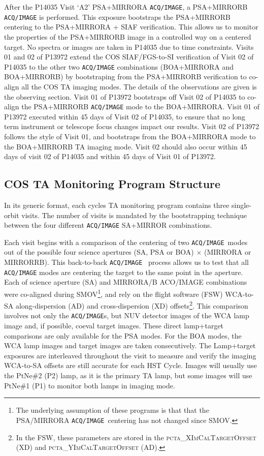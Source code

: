 \documentclass{stsci_report}
\newcommand{\tacq}[1]{\texttt{ACQ/#1}}
\begin{document}
After the P14035 Visit `A2' PSA+MIRRORA \tacq{IMAGE}, a PSA+MIRRORB \tacq{IMAGE} is performed.
This exposure bootstraps the PSA+MIRRORB centering to the PSA+MIRRORA + SIAF verification.
This allows us to monitor the properties of the PSA+MIRRORB image in a controlled way on a centered target. No spectra or images are taken in P14035 due to time constraints.
Visits 01 and 02 of P13972 extend the COS SIAF/FGS-to-SI verification of Visit 02 of P14035 to the other two \tacq{IMAGE} combinations (BOA+MIRRORA and BOA+MIRRORB) by bootstraping from the PSA+MIRRORB verification to co-align all the COS TA imaging modes. The details of the observations are given is the observing section.
Visit 01 of P13972 bootstraps off Visit 02 of P14035 to co-align the PSA+MIRRORB \tacq{IMAGE} mode to the BOA+MIRRORA. Visit 01 of P13972 executed within 45 days of Visit 02 of P14035, to ensure that no long term instrument or telescope focus changes impact our results.
Visit 02 of P13972 follows the style of Visit 01, and bootstraps from the BOA+MIRRORA mode to the BOA+MIRRORB TA imaging mode. Visit 02 should also occur within 45 days of visit 02 of P14035 and within 45 days of Visit 01 of P13972.
\clearpage

\subsection{COS TA Monitoring Program Structure}\label{subsec:structure}

In its generic format, each cycles TA monitoring program contains three single-orbit visits. The number of visits is mandated by the bootstrapping technique between the four different \tacq{IMAGE} SA+MIRROR combinations.

Each visit begins with a comparison of the centering of two \tacq{IMAGE}~modes out of the possible four science apertures (SA, PSA or BOA) $\times$ (MIRRORA or MIRRORRB).
This back-to-back \tacq{IMAGE}~ process allows us to test that all \tacq{IMAGE} modes are centering the target to the same point in the aperture.
Each of science aperture (SA) and MIRRORA/B ACO/IMAGE combinations were co-aligned during SMOV\footnote{The underlying assumption of these programs is that that the PSA/MIRRORA \tacq{IMAGE}~centering has not changed since SMOV.},
and rely on the flight software (FSW) WCA-to-SA along-dispersion (AD) and cross-dispersion (XD)
offsets\footnote{In the FSW, these parameters are stored in the \textsc{pcta\_XImCalTargetOffset} (XD) and \textsc{pcta\_YImCalTargetOffset} (AD).}.
This comparison involves not only the \tacq{IMAGE}s, but NUV detector images of the WCA lamp image and, if possible, coeval target images.
These direct lamp+target comparisons are only available for the PSA modes. For the BOA modes, the WCA lamp images and target images are taken consecutively.
The Lamp+target exposures are interleaved throughout the visit to measure and verify the imaging WCA-to-SA offsets are still accurate for each HST Cycle.
Images will usually use the PtNe\#2 (P2) lamp, as it is the primary TA lamp, but some images will use PtNe\#1 (P1) to monitor both lamps in imaging mode.
\end{document}
